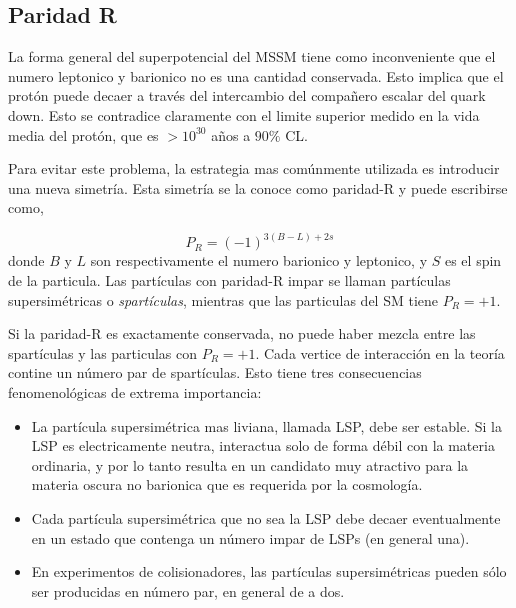 \subsection{Paridad R}

La forma general del superpotencial del MSSM tiene como inconveniente que
el numero leptonico y barionico no es una cantidad conservada. Esto
implica que el protón puede decaer a través del intercambio del compañero
escalar del quark down. Esto se contradice claramente con el limite superior
medido en la vida media del protón, que es $> 10^{30}$ a\~nos a $90\%$ CL\cite{PDG}.

Para evitar este problema, la estrategia mas comúnmente utilizada es introducir
una nueva simetría. Esta simetría se la conoce como paridad-R y puede escribirse como,

\begin{equation}
  P_R = (-1)^{3(B-L)+ 2s}
\end{equation}
%
donde $B$ y $L$ son respectivamente el numero barionico y leptonico, y $S$ es
el spin de la particula. Las partículas con paridad-R impar se llaman partículas
supersimétricas o \emph{spartículas}, mientras que las particulas del SM tiene
$P_R = +1$.

Si la paridad-R es exactamente conservada, no puede haber mezcla entre
las spartículas y las particulas con $P_R = +1$. Cada vertice de interacción
en la teoría contine un número par de spartículas.
Esto tiene tres consecuencias fenomenológicas de extrema importancia:

\begin{itemize}
\item La partícula supersimétrica mas liviana, llamada LSP, debe ser estable. Si la LSP es
  electricamente neutra, interactua solo de forma débil con la materia ordinaria, y por lo tanto
  resulta en un candidato muy atractivo para la materia oscura no barionica que es requerida por
  la cosmología.
\item Cada partícula supersimétrica que no sea la LSP debe decaer eventualmente en un estado que
  contenga un número impar de LSPs (en general una).
\item En experimentos de colisionadores, las partículas supersimétricas pueden sólo ser producidas
  en número par, en general de a dos.
\end{itemize}


